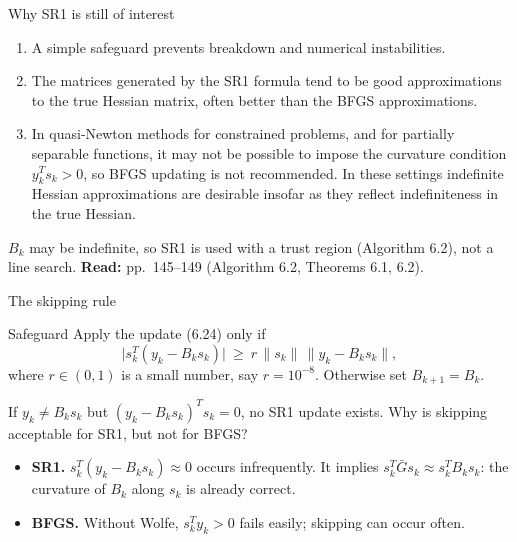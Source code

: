 \documentclass[aspectratio=169,12pt]{beamer}
\newcommand{\Gbar}{\bar{G}}
\newcommand{\readbook}[1]{{\color{red}\textbf{Read:} #1}}
\begin{document}
\begin{frame}{Why SR1 is still of interest}
  \begin{enumerate}\setlength\itemsep{0.5em}
    \item[(i)] A simple safeguard prevents breakdown and numerical instabilities.
    \item[(ii)] The matrices generated by the SR1 formula tend to be \alert{good approximations
      to the true Hessian matrix}, often better than the BFGS approximations.
    \item[(iii)] In quasi-Newton methods for constrained problems, and for partially
      separable functions, it may not be possible to impose the curvature condition
      $y_{k}^{T}s_{k}>0$, so BFGS updating is not recommended. In these settings indefinite
      Hessian approximations are desirable insofar as they reflect indefiniteness in the
      true Hessian.
  \end{enumerate}

  \vspace{0.2em}
  $B_{k}$ may be indefinite, so SR1 is used with a \alert{trust region} (Algorithm 6.2), not a line search.
  \readbook{pp.~145--149 (Algorithm 6.2, Theorems 6.1, 6.2).}
\end{frame}

\begin{frame}{The skipping rule}
  \begin{block}{Safeguard}
    Apply the update (6.24) only if
    \[ \big|s_{k}^{T}(y_{k}-B_{k}s_{k})\big|\ \ge\ r\,\|s_{k}\|\,\|y_{k}-B_{k}s_{k}\| , \tag{6.26} \]
    where $r\in(0,1)$ is a small number, say $r=10^{-8}$. Otherwise set $B_{k+1}=B_{k}$.
  \end{block}

  If $y_{k}\ne B_{k}s_{k}$ but $(y_{k}-B_{k}s_{k})^{T}s_{k}=0$, \alert{no} SR1 update exists.
  Why is skipping acceptable for SR1, but not for BFGS?
  \begin{itemize}\setlength\itemsep{0.35em}
    \item \textbf{SR1.} $s_{k}^{T}(y_{k}-B_{k}s_{k})\approx 0$ occurs infrequently. It implies
      $s_{k}^{T}\Gbar s_{k}\approx s_{k}^{T}B_{k}s_{k}$: the curvature of $B_{k}$ along $s_{k}$ is already correct.
    \item \textbf{BFGS.} Without Wolfe, $s_{k}^{T}y_{k}>0$ fails easily; skipping can occur often.
  \end{itemize}
\end{frame}

\end{document}
